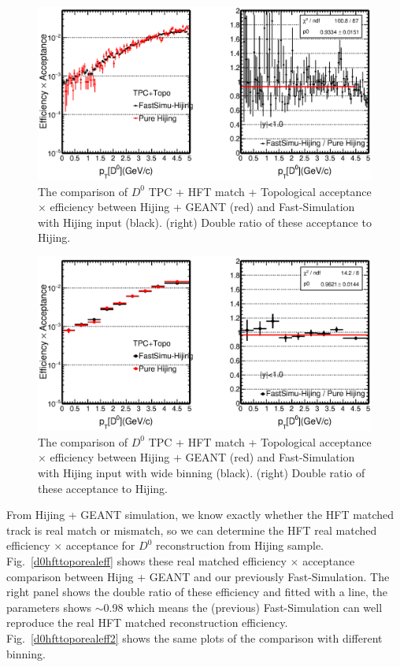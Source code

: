 \documentclass[a4paper]{article}
\begin{document}
\begin{figure}[htbp]
\centering
\includegraphics[keepaspectratio,width=1.0\textwidth,angle=0]{fig/Physics_FastHijingVsPureHijing_HFTTopo2.eps}
\caption{The comparison of $D^0$ TPC + HFT match + Topological acceptance $\times$ efficiency between Hijing + GEANT (red) and Fast-Simulation with Hijing input (black). (right) Double ratio of these acceptance to Hijing.}
\label{d0hfttopoeff}
\end{figure}

\begin{figure}[htbp]
\centering
\includegraphics[keepaspectratio,width=1.0\textwidth,angle=0]{fig/Physics_FastHijingVsPureHijing_HFTTopo.eps}
\caption{The comparison of $D^0$ TPC + HFT match + Topological acceptance $\times$ efficiency between Hijing + GEANT (red) and Fast-Simulation with Hijing input with wide binning (black). (right) Double ratio of these acceptance to Hijing.}
\label{d0hfttopoeff2}
\end{figure}

From Hijing + GEANT simulation, we know exactly whether the HFT matched track is real match or mismatch, so we can determine the HFT real matched efficiency $\times$ acceptance for $D^0$ reconstruction from Hijing sample. Fig.~\ref{d0hfttoporealeff} shows these real matched efficiency $\times$ acceptance comparison between Hijng + GEANT and our previously Fast-Simulation. The right panel shows the double ratio of these efficiency and fitted with a line, the parameters shows $\sim$0.98 which means the (previous) Fast-Simulation can well reproduce the real HFT matched reconstruction efficiency. Fig.~\ref{d0hfttoporealeff2} shows the same plots of the comparison with different binning. 
\end{document}
